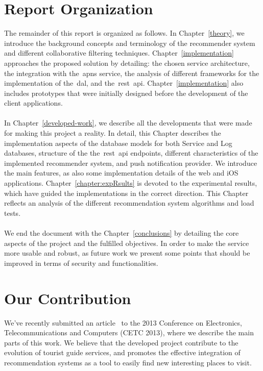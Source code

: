 \section{Report Organization}
\label{sec:reportOrganization}
The remainder of this report is organized as follows. In Chapter~\ref{theory}, we introduce the background concepts and terminology of the recommender system and different collaborative filtering techniques. Chapter~\ref{implementation} approaches the proposed solution by detailing: the chosen service architecture, the integration with the~\gls{apns} service, the analysis of different frameworks for the implementation of the~\gls{dal}, and the~\gls{rest}~\gls{api}. Chapter~\ref{implementation} also includes prototypes that were initially designed before the development of the client applications.\\
\\
In Chapter~\ref{developed-work}, we describe all the developments that were made for making this project a reality. In detail, this Chapter describes the implementation aspects of the database models for both Service and Log databases, structure of the the~\gls{rest}~\gls{api} endpoints, different characteristics of the implemented recommender system, and push notification provider. We introduce the main features, as also some implementation details of the web and iOS applications. Chapter~\ref{chapter:expRsults} is devoted to the experimental results, which have guided the implementations in the correct direction. This Chapter reflects an analysis of the different recommendation system algorithms and load tests.\\
\\
We end the document with the Chapter~\ref{conclusions} by detailing the core aspects of the project and the fulfilled objectives. In order to make the service more usable and robust, as future work we present some points that should be improved in terms of security and functionalities.

\section{Our Contribution}
\label{sec:ourContribution}
We've recently submitted an article~\cite{guideMeArticle} to the 2013 Conference on Electronics, Telecommunications and Computers (CETC 2013), where we describe the main parts of this work. We believe that the developed project contribute to the evolution of tourist guide services, and promotes the effective integration of recommendation systems as a tool to easily find new interesting places to visit.
